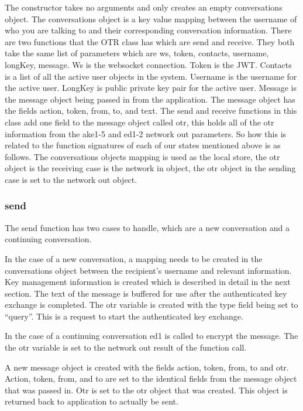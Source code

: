 The constructor takes no arguments and only creates an empty conversations object. The conversations object is a key value mapping between the username of who you are talking to and their corresponding conversation information. There are two functions that the OTR class has which are send and receive. They both take the same list of parameters which are ws, token, contacts, username, longKey, message. Ws is the websocket connection. Token is the JWT. Contacts is a list of all the active user objects in the system. Username is the username for the active user. LongKey is public private key pair for the active user. Message is the message object being passed in from the application. The message object has the fields action, token, from, to, and text. The send and receive functions in this class add one field to the message object called otr, this holds all of the otr information from the ake1-5 and ed1-2 network out parameters. So how this is related to the function signatures of each of our states mentioned above is as follows. The conversations objects mapping is used as the local store, the otr object is the receiving case is the network in object, the otr object in the sending case is set to the network out object.  


\subsubsection{send}


The send function has two cases to handle, which are a new conversation and a continuing conversation.


In the case of a new conversation, a mapping needs to be created in the conversations object between the recipient's username and relevant information. Key management information is created which is described in detail in the next section. The text of the message is buffered for use after the authenticated key exchange is completed. The otr variable is created with the type field being set to “query”. This is a request to start the authenticated key exchange.


In the case of a continuing conversation ed1 is called to encrypt the message. The the otr variable is set to the network out result of the function call. 


A new message object is created with the fields action, token, from, to and otr. Action, token, from, and to are set to the identical fields from the message object that was passed in. Otr is set to the otr object that was created. This object is returned back to application to actually be sent.


